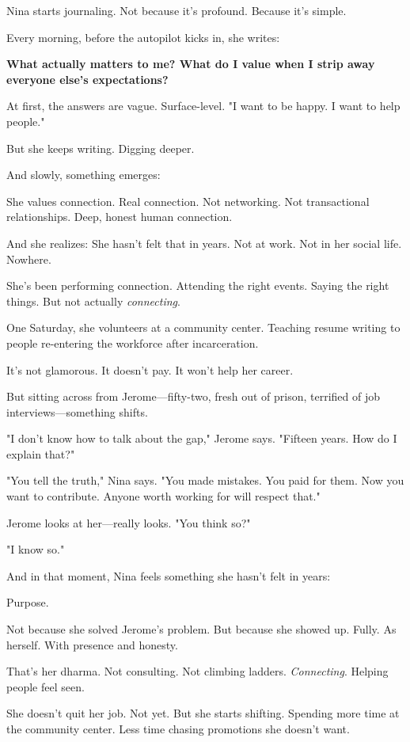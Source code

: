 \documentclass[11pt,twoside]{book}
\begin{document}
Nina starts journaling. Not because it's profound. Because it's simple.

Every morning, before the autopilot kicks in, she writes:

\textbf{What actually matters to me? What do I value when I strip away everyone else's expectations?}

At first, the answers are vague. Surface-level. "I want to be happy. I want to help people."

But she keeps writing. Digging deeper.

And slowly, something emerges:

She values connection. Real connection. Not networking. Not transactional relationships. Deep, honest human connection.

And she realizes: She hasn't felt that in years. Not at work. Not in her social life. Nowhere.

She's been performing connection. Attending the right events. Saying the right things. But not actually \emph{connecting}.

One Saturday, she volunteers at a community center. Teaching resume writing to people re-entering the workforce after incarceration.

It's not glamorous. It doesn't pay. It won't help her career.

But sitting across from Jerome—fifty-two, fresh out of prison, terrified of job interviews—something shifts.

"I don't know how to talk about the gap," Jerome says. "Fifteen years. How do I explain that?"

"You tell the truth," Nina says. "You made mistakes. You paid for them. Now you want to contribute. Anyone worth working for will respect that."

Jerome looks at her—really looks. "You think so?"

"I know so."

And in that moment, Nina feels something she hasn't felt in years:

Purpose.

Not because she solved Jerome's problem. But because she showed up. Fully. As herself. With presence and honesty.

That's her dharma. Not consulting. Not climbing ladders. \emph{Connecting}. Helping people feel seen.

She doesn't quit her job. Not yet. But she starts shifting. Spending more time at the community center. Less time chasing promotions she doesn't want.
\end{document}
